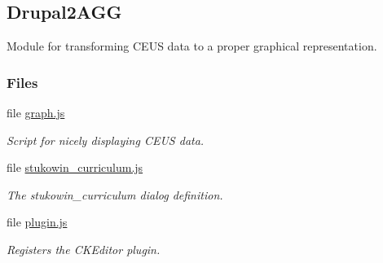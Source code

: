 \hypertarget{group___drupal2_a_g_g}{\subsection{Drupal2\+A\+G\+G}
\label{group___drupal2_a_g_g}
}


Module for transforming C\+E\+U\+S data to a proper graphical representation.  


\subsubsection*{Files}
\begin{DoxyCompactItemize}
\item 
file \hyperlink{graph_8js}{graph.\+js}
\begin{DoxyCompactList}\small\item\em Script for nicely displaying C\+E\+U\+S data. \end{DoxyCompactList}\item 
file \hyperlink{stukowin__curriculum_8js}{stukowin\+\_\+curriculum.\+js}
\begin{DoxyCompactList}\small\item\em The stukowin\+\_\+curriculum dialog definition. \end{DoxyCompactList}\item 
file \hyperlink{plugin_8js}{plugin.\+js}
\begin{DoxyCompactList}\small\item\em Registers the C\+K\+Editor plugin. \end{DoxyCompactList}\end{DoxyCompactItemize}
